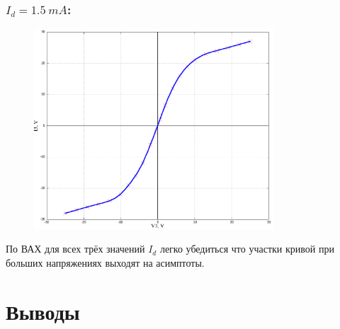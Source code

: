 \documentclass{article}
\begin{document}
\subsubsection*{\(I_d = 1.5\: mA\):}
\begin{figure}[H]
    \centering
    \includegraphics[width=0.8\textwidth]{V-A-1.5.png}
\end{figure}

По ВАХ для всех трёх значений \(I_d\) легко убедиться что участки кривой при больших напряжениях
выходят на асимптоты.



\section{Выводы}
\end{document}
